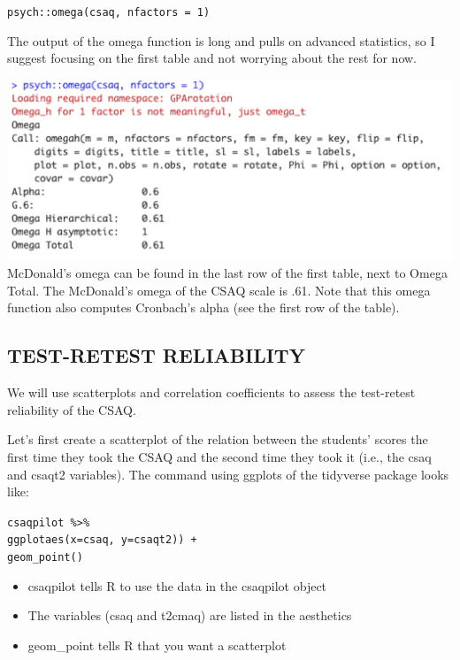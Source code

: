 \documentclass[
]{book}
\providecommand{\tightlist}{%
  \setlength{\itemsep}{0pt}\setlength{\parskip}{0pt}}
\begin{document}
\texttt{psych::omega(csaq,\ nfactors\ =\ 1)}

The output of the omega function is long and pulls on advanced statistics, so I suggest focusing on the first table and not worrying about the rest for now.

\includegraphics{img/4R.4.png}
McDonald's omega can be found in the last row of the first table, next to Omega Total. The McDonald's omega of the CSAQ scale is .61. Note that this omega function also computes Cronbach's alpha (see the first row of the table).

\hypertarget{test-retest-reliability}{%
\subsection{TEST-RETEST RELIABILITY}\label{test-retest-reliability}}

We will use scatterplots and correlation coefficients to assess the test-retest reliability of the CSAQ.

Let's first create a scatterplot of the relation between the students' scores the first time they took the CSAQ and the second time they took it (i.e., the csaq and csaqt2 variables). The command using ggplots of the tidyverse package looks like:

\texttt{csaqpilot\ \%\textgreater{}\%}\\
\texttt{ggplotaes(x=csaq,\ y=csaqt2))\ +}~\\
\texttt{geom\_point()}

\begin{itemize}
\tightlist
\item
  csaqpilot tells R to use the data in the csaqpilot object\\
\item
  The variables (csaq and t2cmaq) are listed in the aesthetics\\
\item
  geom\_point tells R that you want a scatterplot
\end{itemize}
\end{document}
